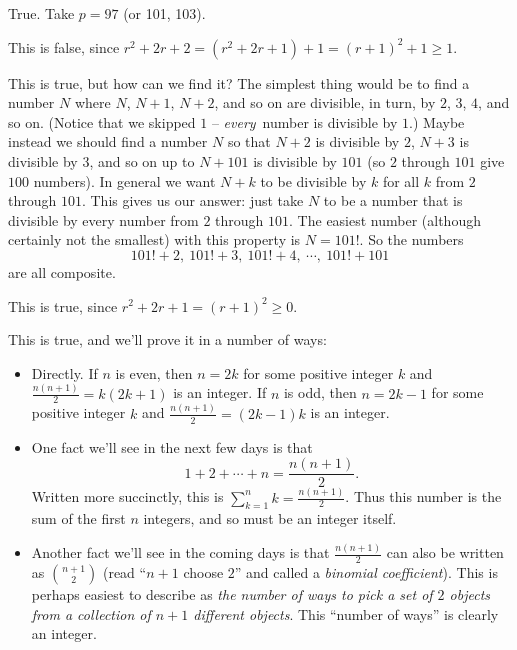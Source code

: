 \documentclass[12pt,letterpaper]{article}
\begin{document}
\begin{enumerate}
  \Answer
  \begin{enumerate}
    \Part True. Take $p=97$ (or 101, 103).

    \Part This is false, since $r^2+2r+2 = (r^2+2r+1)+1 = (r+1)^2+1
    \ge 1$.

    \Part This is true, but how can we find it? The simplest thing
    would be to find a number $N$ where $N$, $N+1$, $N+2$, and so on
    are divisible, in turn, by $2$, $3$, $4$, and so on.  (Notice that
    we skipped $1$ -- \emph{every}\ number is divisible by $1$.)
    Maybe instead we should find a number $N$ so that $N+2$ is
    divisible by $2$, $N+3$ is divisible by $3$, and so on up to
    $N+101$ is divisible by $101$ (so $2$ through $101$ give $100$
    numbers). In general we want $N+k$ to be divisible by $k$ for all
    $k$ from $2$ through $101$.  This gives us our answer: just take
    $N$ to be a number that is divisible by every number from $2$
    through $101$.  The easiest number (although certainly not the
    smallest) with this property is $N=101!$.  So the numbers
    \begin{equation*}
      101!+2,\ 
      101!+3,\ 
      101!+4,\ 
      \cdots,\ 
      101!+101
    \end{equation*}
    are all composite.
  \end{enumerate}

  \Answer
  \begin{enumerate}
    \Part This is true, since $r^2+2r+1 = (r+1)^2 \ge 0$.

    \Part This is true, and we'll prove it in a number of ways:
    \begin{itemize}
    \item Directly. If $n$ is even, then $n=2k$ for some positive
      integer $k$ and $\frac{n(n+1)}{2} = k(2k+1)$ is an integer.  If
      $n$ is odd, then $n=2k-1$ for some positive integer $k$ and
      $\frac{n(n+1)}{2} = (2k-1)k$ is an integer.

    \item One fact we'll see in the next few days is that
      \begin{equation*}
        1 + 2 + \cdots + n = \frac{n(n+1)}{2}.
      \end{equation*}
      Written more succinctly, this is $\displaystyle\sum_{k=1}^{n} k
      = \frac{n(n+1)}{2}$.  Thus this number is the sum of the first
      $n$ integers, and so must be an integer itself.

    \item Another fact we'll see in the coming days is that
      $\frac{n(n+1)}{2}$ can also be written as $\binom{n+1}{2}$
      (read ``$n+1$ choose $2$'' and called a \emph{binomial
        coefficient}).  This is perhaps easiest to describe as
      \emph{the number of ways to pick a set of $2$ objects from a
        collection of $n+1$ different objects}.  This ``number of
      ways'' is clearly an integer. 


\end{itemize}
\end{enumerate}
\end{enumerate}
\end{document}
